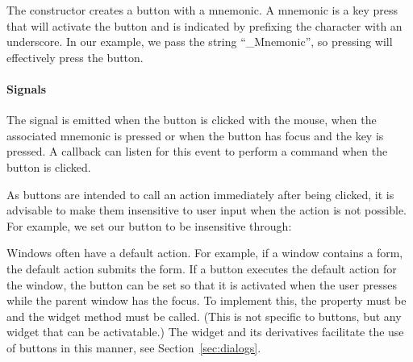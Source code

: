 The  constructor creates a
button with a mnemonic. A mnemonic is a key press that will activate
the button and is indicated by prefixing the character with an
underscore. In our example, we pass the string ``\_Mnemonic'', so
pressing  will effectively press the button.

\paragraph{Signals}

The  signal is emitted when the button is clicked with
the mouse, when the associated mnemonic is pressed or when the button
has focus and the  key is pressed. A callback can listen
for this event to perform a command when the button is clicked.


As buttons are intended to call an action immediately after being
clicked, it is advisable to make them insensitive to user input when
the action is not possible. For example, we  set our button to be
insensitive through: 
\begin{Schunk}
\end{Schunk}

Windows often have a default action. For example, if a window contains
a form, the default action submits the form. If a button
executes the default action for the window, the button can be
set so that it is activated when the user presses  while
the parent window has the focus. To implement this, the property
 must be  and the widget method
 must be called. (This is not specific
to buttons, but any widget that can be activatable.) The
 widget and its derivatives facilitate the use of
buttons in this manner, see Section~\ref{sec:dialogs}.

